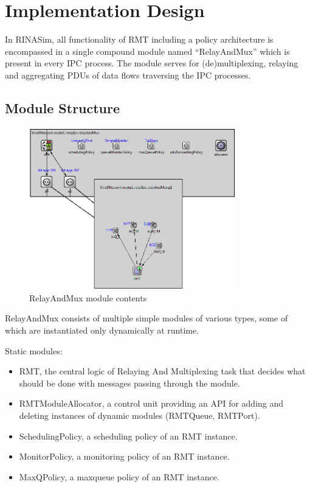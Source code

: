     \section{Implementation Design}

        In RINASim, all functionality of RMT including a policy architecture is encompassed in a single compound module named ``RelayAndMux'' which is present in every IPC process. The module serves for (de)multiplexing, relaying and aggregating PDUs of data flows traversing the IPC processes.

        \subsection{Module Structure}

            \begin{figure}[H]
                \begin{center}
                    \includegraphics[width=0.8\textwidth]{fig/rmt_all.png}
                  \caption{RelayAndMux module contents}
                  \label{omnet-rmt}
                \end{center}
            \end{figure}

            RelayAndMux consists of multiple simple modules of various types, some of which are instantiated only dynamically at runtime.

            Static modules:
            \begin{itemize}
                \item RMT, the central logic of Relaying And Multiplexing task that decides what should be done with messages passing through the module.
                \item RMTModuleAllocator, a control unit providing an API for adding and deleting instances of dynamic modules (RMTQueue, RMTPort).
                \item SchedulingPolicy, a scheduling policy of an RMT instance.
                \item MonitorPolicy, a monitoring policy of an RMT instance.
                \item MaxQPolicy, a maxqueue policy of an RMT instance.
            \end{itemize}

